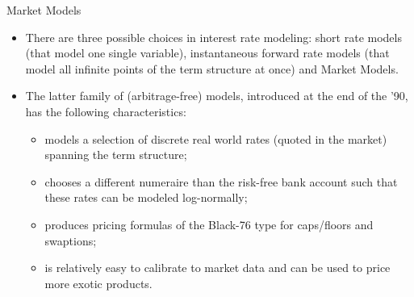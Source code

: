 \documentclass{beamer}
\begin{document}
\begin{frame}{Market Models}
  \begin{itemize}
  \item<1-> There are three possible choices in interest rate modeling: \textcolor{maincolor}{short rate models} (that model one single variable), \textcolor{maincolor}{instantaneous forward rate models} (that model all infinite points of the term structure at once) and \textcolor{maincolor}{Market Models}.
  \item<2-> The latter family of (arbitrage-free) models, introduced at the end of the '90, has the following characteristics:
    \begin{itemize}
    \item<3-> models a selection of discrete real world rates (quoted in the market) spanning the term structure;
    \item<4-> chooses a different numeraire than the risk-free bank account such that these rates can be modeled log-normally;
    \item<5-> produces pricing formulas of the Black-76 type for caps/floors and swaptions;
    \item<6-> is relatively easy to calibrate to market data and can be used to price more exotic products.
    \end{itemize}
  \end{itemize}
\end{frame}
\end{document}
